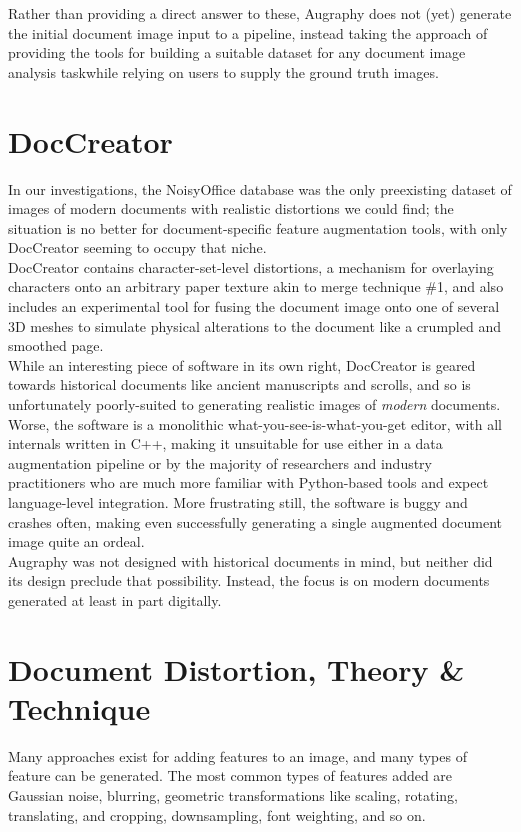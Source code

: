 \documentclass[runningheads]{article}
\begin{document}
Rather than providing a direct answer to these, Augraphy does not (yet) generate the initial document image input to a pipeline, instead taking the approach of providing the tools for building a suitable dataset for any document image analysis taskwhile relying on users to supply the ground truth images.

\section{DocCreator}
\label{sec:orgf17073e}
In our investigations, the NoisyOffice database was the only preexisting dataset of images of modern documents with realistic distortions we could find; the situation is no better for document-specific feature augmentation tools, with only DocCreator seeming to occupy that niche.\\

DocCreator contains character-set-level distortions, a mechanism for overlaying characters onto an arbitrary paper texture akin to merge technique \#1, and also includes an experimental tool for fusing the document image onto one of several 3D meshes to simulate physical alterations to the document like a crumpled and smoothed page.\\

While an interesting piece of software in its own right, DocCreator is geared towards historical documents like ancient manuscripts and scrolls, and so is unfortunately poorly-suited to generating realistic images of \emph{modern} documents. Worse, the software is a monolithic what-you-see-is-what-you-get editor, with all internals written in C++, making it unsuitable for use either in a data augmentation pipeline or by the majority of researchers and industry practitioners who are much more familiar with Python-based tools and expect language-level integration. More frustrating still, the software is buggy and crashes often, making even successfully generating a single augmented document image quite an ordeal.\\

Augraphy was not designed with historical documents in mind, but neither did its design preclude that possibility. Instead, the focus is on modern documents generated at least in part digitally.

\section{Document Distortion, Theory \& Technique}
\label{sec:org24682f8}
Many approaches exist for adding features to an image, and many types of feature can be generated. The most common types of features added are Gaussian noise, blurring, geometric transformations like scaling, rotating, translating, and cropping, downsampling, font weighting, and so on.\\
\end{document}
